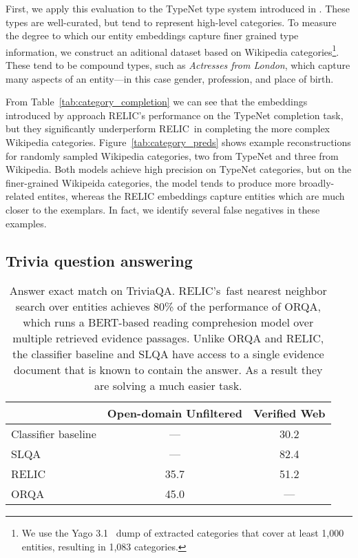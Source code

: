 \documentclass{article} \usepackage{iclr2020_conference,times}
\newcommand{\ack}{RELIC\xspace}
\begin{document}
First, we apply this evaluation to the TypeNet type system introduced in \citep{murty2018hierarchical}.
These types are well-curated, but tend to represent high-level categories.
To measure the degree to which our entity embeddings capture finer grained type information, we construct an aditional dataset based on Wikipedia categories\footnote{We use the Yago 3.1~\citep{mahdisoltani2013yago3} dump of extracted categories that cover at least 1,000 entities, resulting in 1,083 categories.}.
These tend to be compound types, such as {\it Actresses from London}, which capture many aspects of an entity---in this case gender, profession, and place of birth.

From Table~\ref{tab:category_completion} we can see that the embeddings introduced by \citealt{yamada-etal-2017-learning} approach \ack's  performance on the TypeNet completion task, but they significantly underperform \ack~in completing the more complex Wikipedia categories.
Figure~\ref{tab:category_preds} shows example reconstructions for randomly sampled Wikipedia categories, two from TypeNet and three from Wikipedia. 
Both models achieve high precision on TypeNet categories, but on the finer-grained Wikipeida categories, the \citet{yamada-etal-2017-learning} model tends to
produce more broadly-related entites, whereas the \ack embeddings capture entities which are much closer to the exemplars.
In fact, we identify several false negatives in these examples.








\subsection{Trivia question answering}
\label{sec:trivia-qa}





\begin{table}[]
    \small
    \centering
    \begin{tabular}{|l|c|c|}
    \hline
          & Open-domain Unfiltered & Verified Web \\\hline
    Classifier baseline \citep{joshi2017triviaqa} & ---  & 30.2 \\
    SLQA \citep{wang2018multi}                    & ---  & 82.4 \\
    \hline
    \ack                                          & 35.7 & 51.2 \\ 
    ORQA \citep{lee-etal-2019-latent}             & 45.0 & ---  \\
    \hline
    \end{tabular}
    \caption{Answer exact match on TriviaQA. \ack's~fast nearest neighbor search over entities achieves 80\% of the performance of ORQA, which runs a BERT-based reading comprehesion model over multiple retrieved evidence passages. Unlike ORQA and \ack, the classifier baseline and SLQA have access to a single evidence document that is known to contain the answer. As a result they are solving a much easier task. } \label{tab:triviaqa_results}
\end{table}
\end{document}
